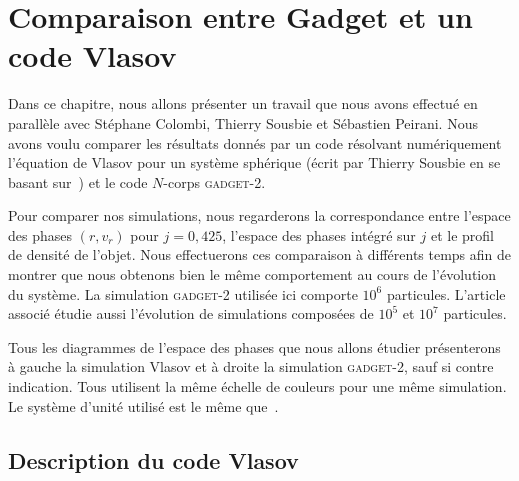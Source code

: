 \chapter{Comparaison entre Gadget et un code Vlasov\label{Chap::VlasovGadget}}
	\minitoc%



	Dans ce chapitre, nous allons présenter un travail que nous avons effectué en parallèle
	avec Stéphane Colombi, Thierry Sousbie et Sébastien Peirani. Nous avons voulu comparer les résultats donnés par un code résolvant
	numériquement l'équation de Vlasov pour un système sphérique (écrit par Thierry Sousbie en se basant sur~\cite{1983PASJ...35..547F}) et le
	code $N$-corps \textsc{gadget-2}.

	Pour comparer nos simulations, nous regarderons la correspondance entre l'espace des phases $(r, v_r)$ pour $j=0,425$, l'espace
	des phases intégré sur $j$ et le profil de densité de l'objet. Nous effectuerons ces comparaison à différents temps afin
	de montrer que nous obtenons bien le même comportement au cours de l'évolution du système. La simulation \textsc{gadget-2} utilisée ici comporte $10^6$
	particules. L'article associé étudie aussi l'évolution de simulations composées de $10^5$ et $10^7$ particules.

	Tous les diagrammes de l'espace des phases que nous allons étudier présenterons à gauche la simulation Vlasov et à droite la simulation
	\textsc{gadget-2}, sauf si contre indication. Tous utilisent la même échelle de couleurs pour une même simulation. Le système d'unité utilisé
	est le même que~\citet{1983PASJ...35..547F}.

	\section{Description du code Vlasov}

